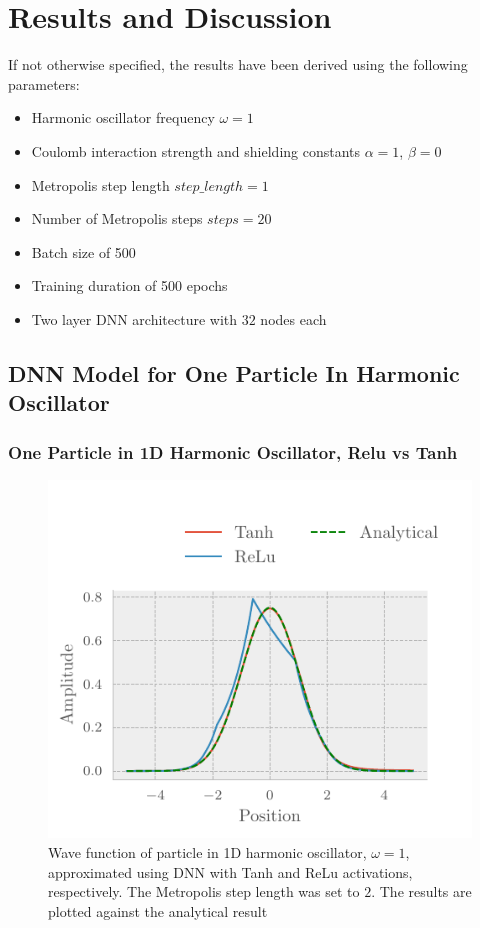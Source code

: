 \section{Results and Discussion}\label{sec:Discussion}

If not otherwise specified, the results have been derived using the following parameters:
\begin{itemize}
	\item Harmonic oscillator frequency $\omega = 1$
	\item Coulomb interaction strength and shielding constants $\alpha = 1$, $\beta = 0$
	\item Metropolis step length $step\_length = 1$
	\item Number of Metropolis steps $steps = 20$
	\item Batch size of 500
	\item Training duration of 500 epochs
	\item Two layer DNN architecture with $32$ nodes each  
\end{itemize}



\subsection{DNN Model for One Particle In Harmonic Oscillator}
\subsubsection{One Particle in 1D Harmonic Oscillator, Relu vs Tanh}

\begin{figure}[H]
	\includegraphics[]{figures/one_part_wavefunc.pdf}
	\caption{Wave function of particle in 1D harmonic oscillator, $\omega=1$, approximated using DNN with Tanh and ReLu activations, respectively. The Metropolis step length was set to $2$. The results are plotted against the analytical result}
	\label{fig:one_part_func}
\end{figure}


